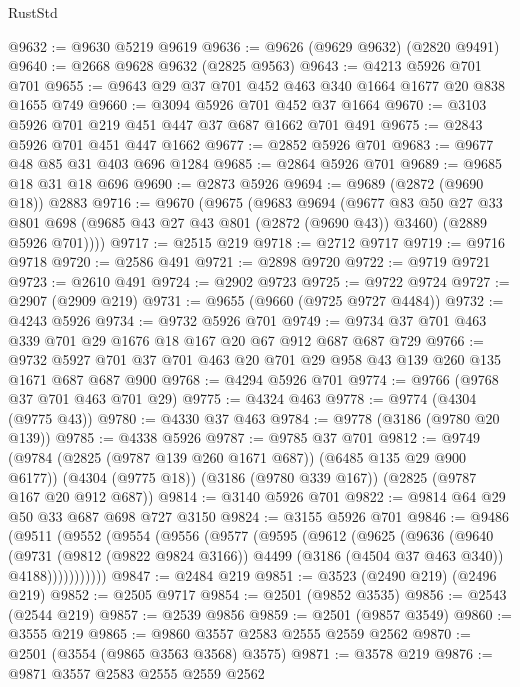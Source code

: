 \begin{lexlean}{RustStd}
\begin{coremodule}
{\begin{coremodule}
{{{{{{{{{{{{{{{{{{{{@9632 := @9630 @5219 @9619
@9636 := @9626 (@9629 @9632) (@2820 @9491)
@9640 := @2668 @9628 @9632 (@2825 @9563)
@9643 := @4213 @5926 @701 @701
@9655 := @9643 @29 @37 @701 @452 @463 @340 @1664 @1677 @20 @838 @1655 @749
@9660 := @3094 @5926 @701 @452 @37 @1664
@9670 := @3103 @5926 @701 @219 @451 @447 @37 @687 @1662 @701 @491
@9675 := @2843 @5926 @701 @451 @447 @1662
@9677 := @2852 @5926 @701
@9683 := @9677 @48 @85 @31 @403 @696 @1284
@9685 := @2864 @5926 @701
@9689 := @9685 @18 @31 @18 @696
@9690 := @2873 @5926
@9694 := @9689 (@2872 (@9690 @18)) @2883
@9716 := @9670
    (@9675
      (@9683
        @9694
        (@9677
          @83
          @50
          @27
          @33
          @801
          @698
          (@9685 @43 @27 @43 @801 (@2872 (@9690 @43)) @3460)
          (@2889 @5926 @701))))
@9717 := @2515 @219
@9718 := @2712 @9717
@9719 := @9716 @9718
@9720 := @2586 @491
@9721 := @2898 @9720
@9722 := @9719 @9721
@9723 := @2610 @491
@9724 := @2902 @9723
@9725 := @9722 @9724
@9727 := @2907 (@2909 @219)
@9731 := @9655 (@9660 (@9725 @9727 @4484))
@9732 := @4243 @5926
@9734 := @9732 @5926 @701
@9749 := @9734 @37 @701 @463 @339 @701 @29 @1676 @18 @167 @20 @67 @912 @687 @687 @729
@9766 := @9732 @5927 @701 @37 @701 @463 @20 @701 @29 @958 @43 @139 @260 @135 @1671 @687 @687 @900
@9768 := @4294 @5926 @701
@9774 := @9766 (@9768 @37 @701 @463 @701 @29)
@9775 := @4324 @463
@9778 := @9774 (@4304 (@9775 @43))
@9780 := @4330 @37 @463
@9784 := @9778 (@3186 (@9780 @20 @139))
@9785 := @4338 @5926
@9787 := @9785 @37 @701
@9812 := @9749
    (@9784 (@2825 (@9787 @139 @260 @1671 @687)) (@6485 @135 @29 @900 @6177))
    (@4304 (@9775 @18))
    (@3186 (@9780 @339 @167))
    (@2825 (@9787 @167 @20 @912 @687))
@9814 := @3140 @5926 @701
@9822 := @9814 @64 @29 @50 @33 @687 @698 @727 @3150
@9824 := @3155 @5926 @701
@9846 := @9486
    (@9511
      (@9552
        (@9554
          (@9556
            (@9577
              (@9595
                (@9612
                  (@9625
                    (@9636
                      (@9640
                        (@9731
                          (@9812 (@9822 @9824 @3166))
                          @4499
                          (@3186 (@4504 @37 @463 @340))
                          @4188)))))))))))
@9847 := @2484 @219
@9851 := @3523 (@2490 @219) (@2496 @219)
@9852 := @2505 @9717
@9854 := @2501 (@9852 @3535)
@9856 := @2543 (@2544 @219)
@9857 := @2539 @9856
@9859 := @2501 (@9857 @3549)
@9860 := @3555 @219
@9865 := @9860 @3557 @2583 @2555 @2559 @2562
@9870 := @2501 (@3554 (@9865 @3563 @3568) @3575)
@9871 := @3578 @219
@9876 := @9871 @3557 @2583 @2555 @2559 @2562
}}}}}}}}}}}}}}}}}}}}
\end{coremodule}}
\end{coremodule}
\end{lexlean}
